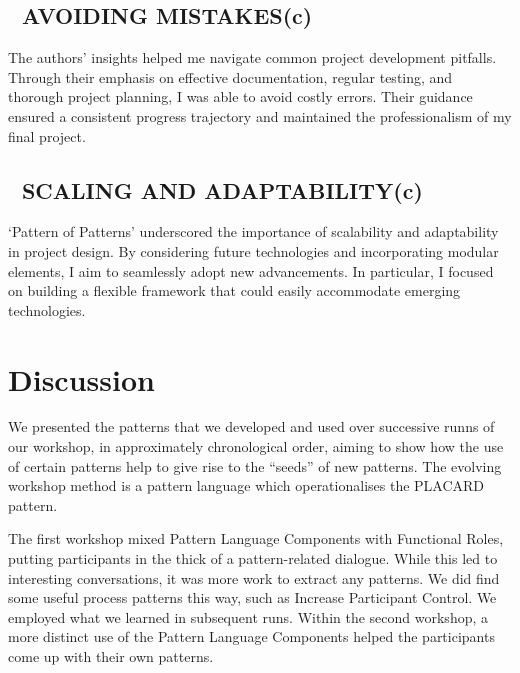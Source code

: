 \documentclass[acmlarge,timestamp]{acmart}
\newcommand{\cognitive}{(c)}
\begin{document}
\subsection*{💎 AVOIDING MISTAKES{\hfill \cognitive}}
The authors' insights helped me navigate common project development
pitfalls.  Through their emphasis on effective documentation, regular
testing, and thorough project planning, I was able to avoid costly
errors.  Their guidance ensured a consistent progress trajectory and
maintained the professionalism of my final project.

\subsection*{💎 SCALING AND ADAPTABILITY{\hfill \cognitive}}
‘Pattern of Patterns’ underscored the importance of scalability and
adaptability in project design.  By considering future technologies
and incorporating modular elements, I aim to seamlessly adopt new
advancements.  In particular, I focused on building a flexible
framework that could easily accommodate emerging technologies.


\section{Discussion}

We presented the patterns that we developed and used over successive
runns of our workshop, in approximately chronological order, aiming to
show how the use of certain patterns help to give rise to the
``seeds'' of new patterns.  The evolving workshop method is a pattern
language which operationalises the PLACARD pattern.

The first workshop mixed {\sc Pattern Language Components} with {\sc
  Functional Roles}, putting participants in the thick of a
pattern-related dialogue.  While this led to interesting
conversations, it was more work to extract any patterns.  We did find some useful process
patterns this way, such as {\sc Increase Participant Control}.  We employed what we learned in subsequent
runs.   Within the second workshop, a more distinct use
of the {\sc Pattern Language Components} helped the participants come
up with their own patterns.
\end{document}
